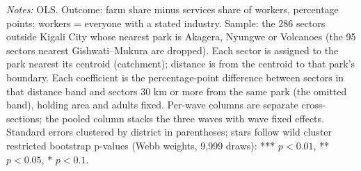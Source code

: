 \documentclass[11pt]{article}
\begin{document}
\begin{table}[H]
\begin{minipage}{0.97\textwidth}
\textit{Notes:} OLS. Outcome: farm share minus services share of workers, percentage points; workers = everyone with a stated industry. Sample: the 286 sectors outside Kigali City whose nearest park is Akagera, Nyungwe or Volcanoes (the 95 sectors nearest Gishwati--Mukura are dropped). Each sector is assigned to the park nearest its centroid (catchment); distance is from the centroid to that park's boundary. Each coefficient is the percentage-point difference between sectors in that distance band and sectors 30 km or more from the same park (the omitted band), holding area and adults fixed. Per-wave columns are separate cross-sections; the pooled column stacks the three waves with wave fixed effects. Standard errors clustered by district in parentheses; stars follow wild cluster restricted bootstrap p-values (Webb weights, 9,999 draws): *** $p<0.01$, ** $p<0.05$, * $p<0.1$.
\end{minipage}
\end{table}
\clearpage
\end{document}
